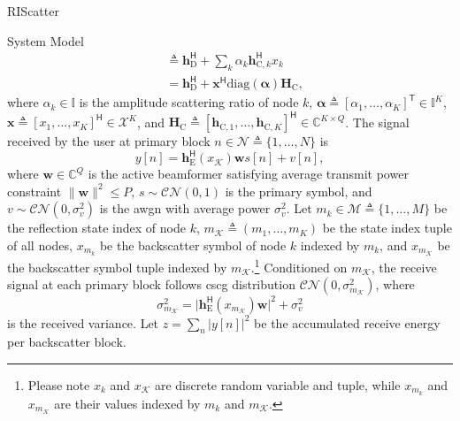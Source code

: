 \documentclass[journal]{IEEEtran}
\begin{document}
\begin{section}{RIScatter}
\begin{subsection}{System Model}
\begin{subequations}
\begin{align}
				 & \triangleq \boldsymbol{h}_{\text{D}}^\mathsf{H} + \sum_{k} \alpha_k \boldsymbol{h}_{\text{C},k}^\mathsf{H} x_k \label{eq:equivalent_channel_bc}                    \\
				 & = \boldsymbol{h}_{\text{D}}^\mathsf{H} + \boldsymbol{x}^\mathsf{H} \mathrm{diag}(\boldsymbol{\alpha}) \boldsymbol{H}_{\text{C}}, \label{eq:equivalent_channel_ris}
			\end{align}
		\end{subequations}
		where $\alpha_k \in \mathbb{I}$ is the amplitude scattering ratio of node $k$, $\boldsymbol{\alpha} \triangleq [\alpha_1,\ldots,\alpha_K]^\mathsf{T} \in \mathbb{I}^{K}$, $\boldsymbol{x} \triangleq [x_1,\ldots,x_K]^\mathsf{H} \in \mathcal{X}^{K}$, and $\boldsymbol{H}_{\text{C}} \triangleq [\boldsymbol{h}_{\text{C},1},\ldots,\boldsymbol{h}_{\text{C},K}]^\mathsf{H} \in \mathbb{C}^{K \times Q}$.
		The signal received by the user at primary block $n \in \mathcal{N} \triangleq \{1,\ldots,N\}$ is
		\begin{equation}
			y[n] = \boldsymbol{h}_{\text{E}}^\mathsf{H}(x_{\mathcal{K}}) \boldsymbol{w} s[n] + v[n],
			\label{eq:receive_signal}
		\end{equation}
		where $\boldsymbol{w} \in \mathbb{C}^{Q}$ is the active beamformer satisfying average transmit power constraint $\lVert \boldsymbol{w} \rVert^2 \le P$, $s \sim \mathcal{CN}(0,1)$ is the primary symbol, and $v \sim \mathcal{CN}(0,\sigma_v^2)$ is the \gls{awgn} with average power $\sigma_v^2$.
		Let $m_k \in \mathcal{M} \triangleq \{1,\ldots,M\}$ be the reflection state index of node $k$, $m_{\mathcal{K}} \triangleq (m_1,\ldots,m_K)$ be the state index tuple of all nodes, $x_{m_k}$ be the backscatter symbol of node $k$ indexed by $m_k$, and $x_{m_\mathcal{K}}$ be the backscatter symbol tuple indexed by $m_{\mathcal{K}}$.\footnote{Please note $x_k$ and $x_{\mathcal{K}}$ are discrete random variable and tuple, while $x_{m_k}$ and $x_{m_{\mathcal{K}}}$ are their values indexed by $m_k$ and $m_{\mathcal{K}}$.}
		Conditioned on $m_{\mathcal{K}}$, the receive signal at each primary block follows \gls{cscg} distribution $\mathcal{CN}(0,\sigma_{m_{\mathcal{K}}}^2)$, where
		\begin{equation}
			\sigma_{m_{\mathcal{K}}}^2 = \lvert \boldsymbol{h}_{\text{E}}^\mathsf{H}(x_{m_{\mathcal{K}}}) \boldsymbol{w} \rvert^2 + \sigma_v^2
			\label{eq:receive_variance}
		\end{equation}
		is the received variance.
		Let $z=\sum_{n} \bigl\lvert y[n] \bigr\rvert^2$ be the accumulated receive energy per backscatter block.

\end{subsection}
\end{section}
\end{document}
